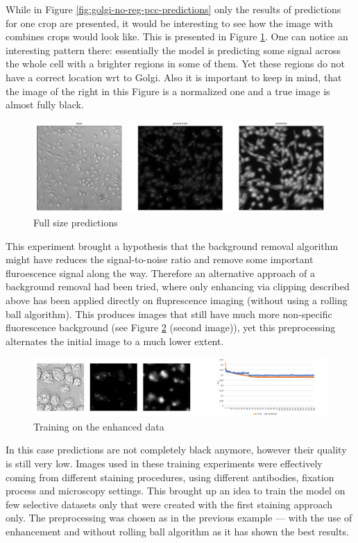 While in Figure \ref{fig:golgi-no-reg-pcc-predictions} only the results of predictions for one crop are presented, it would be interesting to see how the image with combines crops would look like. This is presented in Figure \ref{fig:golgi-no-reg-pcc-predictions-full}. One can notice an interesting pattern there: essentially the model is predicting some signal across the whole cell with a brighter regions in some of them. Yet these regions do not have a correct location wrt to Golgi. Also it is important to keep in mind, that the image of the right in this Figure is a normalized one and a true image is almost fully black. 
\begin{figure}[htb]
	\begin{center}
		\includegraphics[width=0.8\linewidth]{bilder/golgi/full-img.png}
		\caption{Full size predictions}\label{fig:golgi-no-reg-pcc-predictions-full}
	\end{center}
\end{figure}

This experiment brought a hypothesis that the background removal algorithm might have reduces the signal-to-noise ratio and remove some important fluroescence signal along the way. Therefore an alternative approach of a background removal had been tried, where only enhancing via clipping described above has been applied directly on fluprescence imaging (without using a rolling ball algorithm). This produces images that still have much more non-specific fluorescence background (see Figure \ref{fig:golgi-enhanced-predictions} (second image)), yet this preprocessing alternates the initial image to a much lower extent. 

\begin{figure}[htb]
	\begin{center}
		\includegraphics[width=\linewidth]{bilder/golgi/enhanced-crop.png}
		\caption{Training on the enhanced data}\label{fig:golgi-enhanced-predictions}
	\end{center}
\end{figure}
In this case predictions are not completely black anymore, however their quality is still very low. Images used in these training experiments were effectively coming from different staining procedures, using different antibodies, fixation process and microscopy settings. This brought up an idea to train the model on few selective datasets only that were created with the first staining approach only. The preprocessing was chosen as in the previous example --- with the use of enhancement and without rolling ball algorithm as it has shown the best results.

